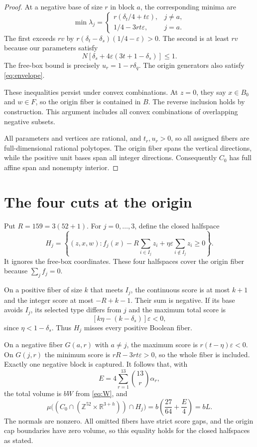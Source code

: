 \documentclass[11pt]{article}
\newcommand{\R}{\mathbb R}
\newcommand{\Z}{\mathbb Z}
\newcommand{\MI}{\mu}
\begin{document}
\begin{proof}
At a negative base of size $r$ in block $a$, the corresponding minima are
\[
 \min\lambda_j=
 \begin{cases}
 r(\delta_t/4+t\varepsilon),&j\ne a,\\
 1/4-3rt\varepsilon,&j=a.
 \end{cases}
\]
The first exceeds $rv$ by
$r(\delta_t-\delta_s)(1/4-\varepsilon)>0$. The second is at least $rv$
because our parameters satisfy
\begin{equation}\label{eq:geom}
 N[\delta_s+4\varepsilon(3t+1-\delta_s)]\le1.
\end{equation}
The free-box bound is precisely $u_r=1-r\delta_q$. The origin generators
also satisfy \eqref{eq:envelope}.

These inequalities persist under convex combinations. At $z=0$, they
say $x\in B_0$ and $w\in F$, so the origin fiber is contained in $B$.
The reverse inclusion holds by construction. This argument includes all
convex combinations of overlapping negative subsets.

All parameters and vertices are rational, and $t_r,u_r>0$, so all assigned
fibers are full-dimensional rational polytopes. The origin fiber spans
the vertical directions, while the positive unit bases span all integer
directions. Consequently $C_0$ has full affine span and nonempty interior.
\end{proof}

\section{The four cuts at the origin}
Put $R=159=3(52+1)$. For $j=0,\ldots,3$, define the closed halfspace
\[
 H_j=\left\{(z,x,w):f_j(x)-R\sum_{i\in I_j}z_i
                  +\eta\varepsilon\sum_{i\notin I_j}z_i\ge0\right\}.
\]
It ignores the free-box coordinates. These four halfspaces cover the origin
fiber because $\sum_j f_j=0$.

On a positive fiber of size $k$ that meets $I_j$, the continuous score is
at most $k+1$ and the integer score at most $-R+k-1$. Their sum is negative.
If its base avoids $I_j$, its selected type differs from $j$ and the maximum
total score is
\[
 [k\eta-(k-\delta_s)]\varepsilon<0,
\]
since $\eta<1-\delta_s$. Thus $H_j$ misses every positive Boolean fiber.

On a negative fiber $G(a,r)$ with $a\ne j$, the maximum score is
$r(t-\eta)\varepsilon<0$. On $G(j,r)$ the minimum score is
$rR-3rt\varepsilon>0$, so the whole fiber is included. Exactly one
negative block is captured. It follows that, with
\[
 E=4\sum_{r=1}^{13}\binom{13}{r}\alpha_r,
\]
the total volume is $bW$ from \eqref{eq:W}, and
\begin{equation}\label{eq:originmass}
 \MI\bigl((C_0\cap(\Z^{52}\times\R^{3+h}))\cap H_j\bigr)
       =b\left(\frac{27}{64}+\frac E4\right)=bL.
\end{equation}
The normals are nonzero. All omitted fibers have strict score gaps, and
the origin cap boundaries have zero volume, so this equality holds for
the closed halfspaces as stated.
\end{document}
